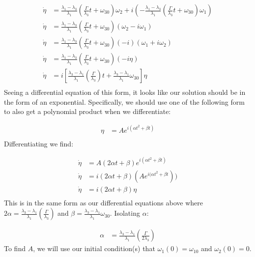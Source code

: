 \documentclass{article}
\begin{document}
\begin{align*}
    \dot{\eta} &= \frac{\lambda_1-\lambda_3}{\lambda_1}\left( \frac{\Gamma }{\lambda_3}t + \omega_{30} \right) \omega_2 + i \left( -\frac{\lambda_1-\lambda_3}{\lambda_1}\left( \frac{\Gamma }{\lambda_3}t + \omega_{30} \right) \omega_1\right)  \\
    \dot{\eta} &= \frac{\lambda_1-\lambda_3}{\lambda_1}\left( \frac{\Gamma }{\lambda_3}t + \omega_{30} \right) (\omega_2-i\omega_1) \\
    \dot{\eta} &= \frac{\lambda_1-\lambda_3}{\lambda_1}\left( \frac{\Gamma }{\lambda_3}t + \omega_{30} \right) (-i)(\omega_1+i\omega_2) \\
    \dot{\eta} &= \frac{\lambda_1-\lambda_3}{\lambda_1}\left( \frac{\Gamma }{\lambda_3}t + \omega_{30} \right) (-i\eta) \\
    \dot{\eta} &= i\left[ \frac{\lambda_3-\lambda_1}{\lambda_1}\left( \frac{\Gamma }{\lambda_3}\right) t  +  \frac{\lambda_3-\lambda_1}{\lambda_1}\omega_{30} \right] \eta \\
\end{align*}
Seeing a differential equation of this form, it looks like our solution should be in the form of an exponential. Specifically, we should use one of the following form to also get a polynomial product when we differentiate:

\begin{align*}
    \eta &= Ae^{i(\alpha t^2 + \beta t)} \\
\end{align*}
Differentiating we find:

\begin{align*}
    \dot{\eta} &=A (2\alpha t + \beta ) e^{i(\alpha t^2 + \beta t)} \\
    \dot{\eta} &=i(2\alpha t + \beta ) (Ae^{i(\alpha t^2 + \beta t})) \\
    \dot{\eta} &=i(2\alpha t + \beta ) \eta \\
\end{align*}
This is in the same form as our differential equations above where $2\alpha = \frac{\lambda_3-\lambda_1}{\lambda_1}\left( \frac{\Gamma }{\lambda_3}\right)$ and $\beta = \frac{\lambda_3-\lambda_1}{\lambda_1}\omega_{30}$. Isolating $\alpha$:

\begin{align*}
    \alpha &= \frac{\lambda_3-\lambda_1}{\lambda_1}\left( \frac{\Gamma }{2\lambda_3}\right) 
\end{align*}
To find $A$, we will use our initial condition(s) that $\omega_1(0) = \omega_{10}$ and  $\omega_2(0) = 0$. 
\end{document}
